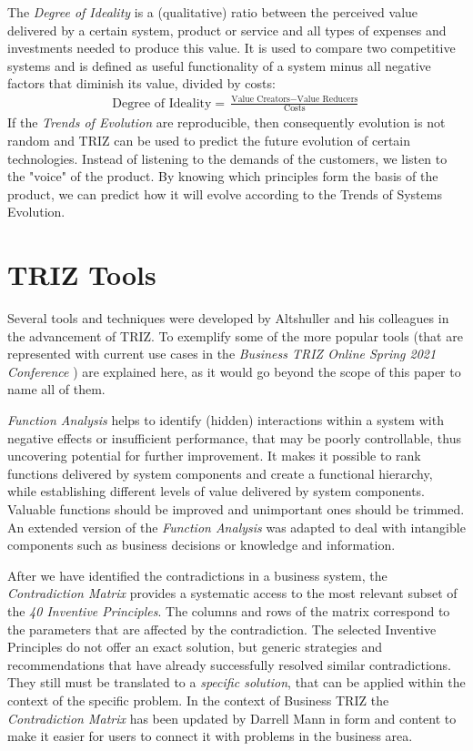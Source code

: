 \documentclass[11pt,a4paper]{article}
\begin{document}
The \emph{Degree of Ideality} is a (qualitative) ratio between the perceived
value delivered by a certain system, product or service and all types of
expenses and investments needed to produce this value. It is used to compare
two competitive systems and is defined as useful functionality of a system
minus all negative factors that diminish its value, divided by costs:
\begin{gather*}
  \text{Degree of Ideality} = \frac{\text{Value Creators}-\text{Value
      Reducers}}{\text{Costs}}
\end{gather*}
If the \emph{Trends of Evolution} are reproducible, then consequently
evolution is not random and TRIZ can be used to predict the future evolution
of certain technologies. Instead of listening to the demands of the customers,
we listen to the "voice" of the product. By knowing which principles form the
basis of the product, we can predict how it will evolve according to the
Trends of Systems Evolution.

\section{TRIZ Tools}

Several tools and techniques were developed by Altshuller and his colleagues
in the advancement of TRIZ. To exemplify some of the more popular tools (that
are represented with current use cases in the \emph{Business TRIZ Online
  Spring 2021 Conference} \cite{7}) are explained here, as it would go beyond
the scope of this paper to name all of them.

\emph{Function Analysis} helps to identify (hidden) interactions within a
system with negative effects or insufficient performance, that may be poorly
controllable, thus uncovering potential for further improvement. It makes it
possible to rank functions delivered by system components and create a
functional hierarchy, while establishing different levels of value delivered
by system components. Valuable functions should be improved and unimportant
ones should be trimmed. An extended version of the \emph{Function Analysis}
was adapted to deal with intangible components such as business decisions or
knowledge and information. \cite{5}

After we have identified the contradictions in a business system, the
\emph{Contradiction Matrix} provides a systematic access to the most relevant
subset of the \emph{40 Inventive Principles}. The columns and rows of the
matrix correspond to the parameters that are affected by the contradiction.
The selected Inventive Principles do not offer an exact solution, but generic
strategies and recommendations that have already successfully resolved similar
contradictions. They still must be translated to a \emph{specific solution},
that can be applied within the context of the specific problem. In the context
of Business TRIZ the \emph{Contradiction Matrix} has been updated by Darrell
Mann in form and content to make it easier for users to connect it with
problems in the business area. \cite{8}
\end{document}
